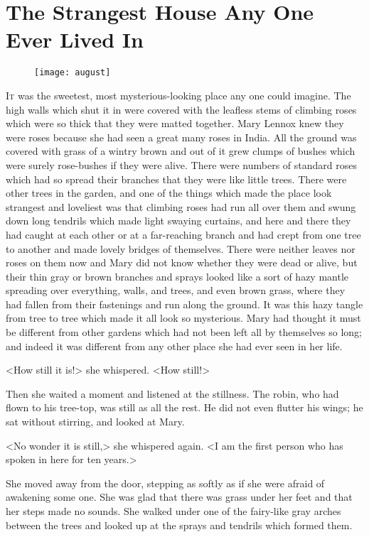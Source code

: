 \chapter{The Strangest House Any One Ever Lived In} 
\begin{figure}[t!]
\centering
\texttt{[image: august]}
\end{figure}
 \lettrine[]{I}{t} was the sweetest, most mysterious-looking place any one could imagine. The high walls which shut it in were covered with the leafless stems of climbing roses which were so thick that they were matted together. Mary Lennox knew they were roses because she had seen a great many roses in India. All the ground was covered with grass of a wintry brown and out of it grew clumps of bushes which were surely rose-bushes if they were alive. There were numbers of standard roses which had so spread their branches that they were like little trees. There were other trees in the garden, and one of the things which made the place look strangest and loveliest was that climbing roses had run all over them and swung down long tendrils which made light swaying curtains, and here and there they had caught at each other or at a far-reaching branch and had crept from one tree to another and made lovely bridges of themselves. There were neither leaves nor roses on them now and Mary did not know whether they were dead or alive, but their thin gray or brown branches and sprays looked like a sort of hazy mantle spreading over everything, walls, and trees, and even brown grass, where they had fallen from their fastenings and run along the ground. It was this hazy tangle from tree to tree which made it all look so mysterious. Mary had thought it must be different from other gardens which had not been left all by themselves so long; and indeed it was different from any other place she had ever seen in her life.

<How still it is!> she whispered. <How still!>

Then she waited a moment and listened at the stillness. The robin, who had flown to his tree-top, was still as all the rest. He did not even flutter his wings; he sat without stirring, and looked at Mary.

<No wonder it is still,> she whispered again. <I am the first person who has spoken in here for ten years.>

She moved away from the door, stepping as softly as if she were afraid of awakening some one. She was glad that there was grass under her feet and that her steps made no sounds. She walked under one of the fairy-like gray arches between the trees and looked up at the sprays and tendrils which formed them.

